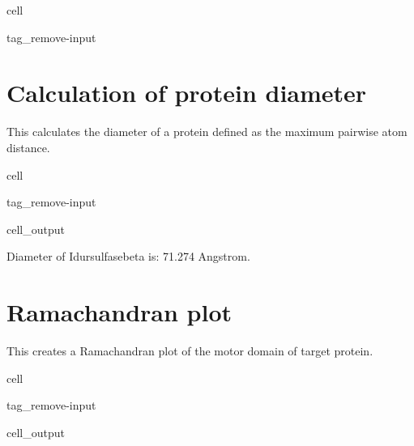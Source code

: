 \documentclass[letterpaper,10pt,english]{jupyterBook}
\begin{document}
\begin{sphinxuseclass}{cell}
\begin{sphinxuseclass}{tag_remove-input}
\end{sphinxuseclass}
\end{sphinxuseclass}

\section{Calculation of protein diameter}
\label{\detokenize{ipynb/chapter3:calculation-of-protein-diameter}}
\sphinxAtStartPar
This calculates the diameter of a protein defined as the maximum pairwise atom distance.

\begin{sphinxuseclass}{cell}
\begin{sphinxuseclass}{tag_remove-input}\begin{sphinxVerbatimOutput}

\begin{sphinxuseclass}{cell_output}
\begin{sphinxVerbatim}[commandchars=\\\{\}]
Diameter of Idursulfasebeta is: 71.274 Angstrom.
\end{sphinxVerbatim}

\end{sphinxuseclass}\end{sphinxVerbatimOutput}

\end{sphinxuseclass}
\end{sphinxuseclass}

\section{Ramachandran plot}
\label{\detokenize{ipynb/chapter3:ramachandran-plot}}
\sphinxAtStartPar
This creates a Ramachandran plot of the motor domain of target protein.

\begin{sphinxuseclass}{cell}
\begin{sphinxuseclass}{tag_remove-input}\begin{sphinxVerbatimOutput}

\begin{sphinxuseclass}{cell_output}
\noindent{}

\end{sphinxuseclass}\end{sphinxVerbatimOutput}

\end{sphinxuseclass}
\end{sphinxuseclass}
\sphinxstepscope
\end{document}

